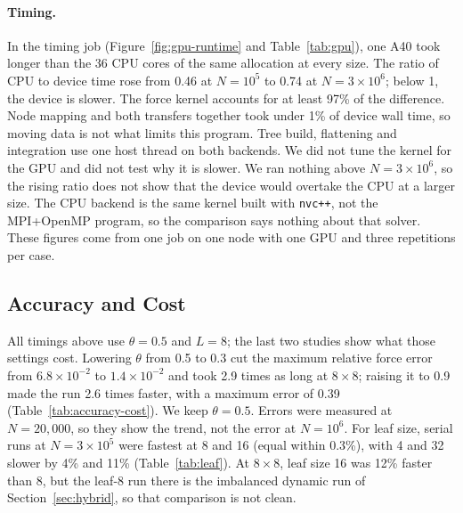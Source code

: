 \documentclass[10pt,a4paper,twocolumn,twoside]{rho-class/rho}
\begin{document}
\paragraph{Timing.} In the timing job (Figure~\ref{fig:gpu-runtime} and Table~\ref{tab:gpu}), one A40 took longer than the 36 CPU cores of the same allocation at every size. The ratio of CPU to device time rose from 0.46 at $N=10^5$ to 0.74 at $N=3\times10^6$; below 1, the device is slower. The force kernel accounts for at least 97\% of the difference. Node mapping and both transfers together took under 1\% of device wall time, so moving data is not what limits this program. Tree build, flattening and integration use one host thread on both backends. We did not tune the kernel for the GPU and did not test why it is slower. We ran nothing above $N=3\times10^6$, so the rising ratio does not show that the device would overtake the CPU at a larger size. The CPU backend is the same kernel built with \texttt{nvc++}, not the MPI+OpenMP program, so the comparison says nothing about that solver. These figures come from one job on one node with one GPU and three repetitions per case.

\subsection{Accuracy and Cost}
\label{sec:accuracy}
All timings above use $\theta=0.5$ and $L=8$; the last two studies show what those settings cost. Lowering $\theta$ from 0.5 to 0.3 cut the maximum relative force error from $6.8\times10^{-2}$ to $1.4\times10^{-2}$ and took 2.9 times as long at $8\times8$; raising it to 0.9 made the run 2.6 times faster, with a maximum error of 0.39 (Table~\ref{tab:accuracy-cost}). We keep $\theta=0.5$. Errors were measured at $N=20{,}000$, so they show the trend, not the error at $N=10^6$. For leaf size, serial runs at $N=3\times10^5$ were fastest at 8 and 16 (equal within 0.3\%), with 4 and 32 slower by 4\% and 11\% (Table~\ref{tab:leaf}). At $8\times8$, leaf size 16 was 12\% faster than 8, but the leaf-8 run there is the imbalanced dynamic run of Section~\ref{sec:hybrid}, so that comparison is not clean.
\end{document}
